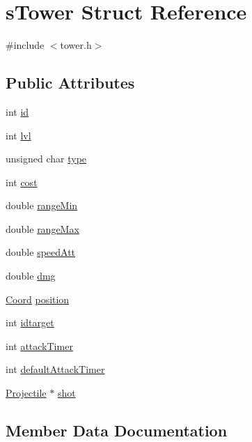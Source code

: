 \hypertarget{structs_tower}{}\section{s\+Tower Struct Reference}
\label{structs_tower}


{\ttfamily \#include $<$tower.\+h$>$}

\subsection*{Public Attributes}
\begin{DoxyCompactItemize}
\item 
int \hyperlink{structs_tower_ad7fbe8e544beaf6d2db2205bbdb99435}{id}
\item 
int \hyperlink{structs_tower_ac20e0db3500584704e60be50e8acf98f}{lvl}
\item 
unsigned char \hyperlink{structs_tower_a3891f13f52d26c0661d516777f847ff8}{type}
\item 
int \hyperlink{structs_tower_a5d829c98e70fa2b23f3dd5b88d88c011}{cost}
\item 
double \hyperlink{structs_tower_a337351f73af1fb962a111cd1b61df09b}{range\+Min}
\item 
double \hyperlink{structs_tower_a62624df1e766b331cd575fa4e2640bbc}{range\+Max}
\item 
double \hyperlink{structs_tower_aa5d34661ad01458c765a168ecd0e0a83}{speed\+Att}
\item 
double \hyperlink{structs_tower_a0c590cfdfbe22e0e65ca8e9c223df668}{dmg}
\item 
\hyperlink{coordonates_8h_aff9d4468ac7a973ce7e5cfb5bd39bc33}{Coord} \hyperlink{structs_tower_aaf5a4946b54c0dd20b83c494dcef2602}{position}
\item 
int \hyperlink{structs_tower_a3a2434471dec8e3a4d46cdd9aa635c79}{idtarget}
\item 
int \hyperlink{structs_tower_ae7011237193523458ecce3b90d200057}{attack\+Timer}
\item 
int \hyperlink{structs_tower_aaa900c24105d980a684815fa9d933ebd}{default\+Attack\+Timer}
\item 
\hyperlink{projectile_8h_a32e7d63dd0acece21597e95a3de34345}{Projectile} $\ast$ \hyperlink{structs_tower_a3c9d5ef0a9853b968919775398307a23}{shot}
\end{DoxyCompactItemize}


\subsection{Member Data Documentation}
\hypertarget{structs_tower_ae7011237193523458ecce3b90d200057}{}
